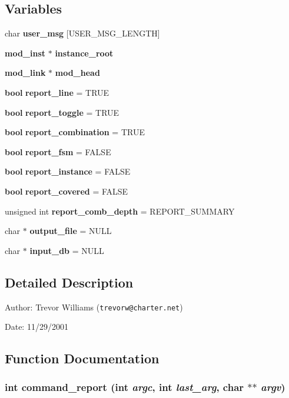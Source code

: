\subsection*{Variables}
\begin{CompactItemize}
\item 
char {\bf user\_\-msg} [USER\_\-MSG\_\-LENGTH]
\item 
{\bf mod\_\-inst} $\ast$ {\bf instance\_\-root}
\item 
{\bf mod\_\-link} $\ast$ {\bf mod\_\-head}
\item 
{\bf bool} {\bf report\_\-line} = TRUE
\item 
{\bf bool} {\bf report\_\-toggle} = TRUE
\item 
{\bf bool} {\bf report\_\-combination} = TRUE
\item 
{\bf bool} {\bf report\_\-fsm} = FALSE
\item 
{\bf bool} {\bf report\_\-instance} = FALSE
\item 
{\bf bool} {\bf report\_\-covered} = FALSE
\item 
unsigned int {\bf report\_\-comb\_\-depth} = REPORT\_\-SUMMARY
\item 
char $\ast$ {\bf output\_\-file} = NULL
\item 
char $\ast$ {\bf input\_\-db} = NULL
\end{CompactItemize}


\subsection{Detailed Description}
\begin{Desc}
\item[Author:]Trevor Williams ({\tt trevorw@charter.net}) \end{Desc}
\begin{Desc}
\item[Date:]11/29/2001\end{Desc}


\subsection{Function Documentation}
\subsubsection{\setlength{\rightskip}{0pt plus 5cm}int command\_\-report (int {\em argc}, int {\em last\_\-arg}, char $\ast$$\ast$ {\em argv})}\label{report_8c_a19}


